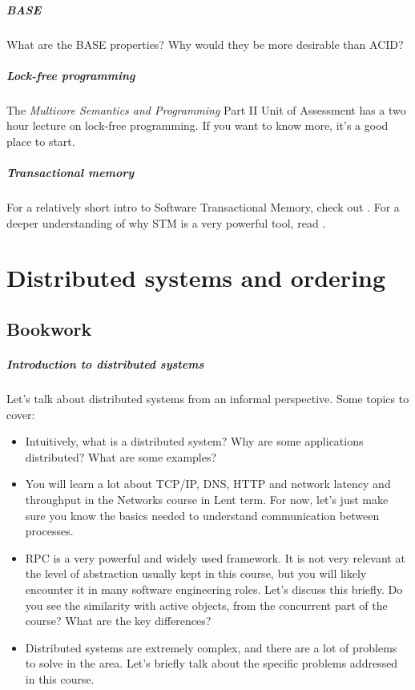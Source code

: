 \documentclass[12pt,a4paper,oneside,openright]{report}
\newcommand{\question}[2]{\paragraph{#1} #2}
\begin{document}
\question{BASE}{What are the BASE properties? Why would they be more
  desirable than ACID?}

\question{Lock-free programming}{The \emph{Multicore Semantics and
    Programming} Part II Unit of Assessment has a two hour lecture on
  lock-free programming. If you want to know more, it's a good place
  to start.}

\question{Transactional memory}{For a relatively short intro to
  Software Transactional Memory, check out
  \cite[Chapter~18]{ArtMultiprocessorProgramming}. For a deeper
  understanding of why STM is a very powerful tool, read \cite{CMT}.}


\chapter{Distributed systems and ordering}

\section{Bookwork}

\question{Introduction to distributed systems}{Let's talk about
  distributed systems from an informal perspective. Some topics to
  cover:
  \begin{itemize}
  \item Intuitively, what is a distributed system? Why are some
    applications distributed? What are some examples?
  \item You will learn a lot about TCP/IP, DNS, HTTP and network
    latency and throughput in the Networks course in Lent term. For
    now, let's just make sure you know the basics needed to understand
    communication between processes.
  \item RPC is a very powerful and widely used framework. It is not
    very relevant at the level of abstraction usually kept in this
    course, but you will likely encounter it in many software
    engineering roles. Let's discuss this briefly. Do you see the
    similarity with active objects, from the concurrent part of the
    course? What are the key differences?
  \item Distributed systems are extremely complex, and there are a lot
    of problems to solve in the area. Let's briefly talk about the
    specific problems addressed in this course.
  \end{itemize}
}
\end{document}
